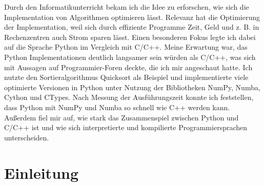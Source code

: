 \documentclass[11pt,a4paper]{article}
\begin{document}
Durch den Informatikunterricht bekam ich die Idee zu erforschen, wie sich
die Implementation von Algorithmen optimieren lässt.
Relevanz hat die Optimierung der Implementation, weil sich durch effiziente Programme Zeit, Geld
und z. B. in Rechenzentren auch Strom sparen lässt.
Einen besonderen Fokus legte ich dabei auf die Sprache Python im Vergleich mit C/C++.
Meine Erwartung war, das Python Implementationen deutlich langsamer sein würden als C/C++,
was sich mit Aussagen auf Programmier-Foren deckte, die ich mir angeschaut hatte.
Ich nutzte den Sortieralgorithmus Quicksort als Beispiel und implementierte viele optimierte Versionen
in Python unter Nutzung der Bibliotheken NumPy, Numba, Cython und CTypes.
Nach Messung der Ausführungszeit konnte ich feststellen, dass Python mit NumPy und Numba
so schnell wie C++ werden kann.
Außerdem fiel mir auf, wie stark das Zusammenspiel zwischen Python und C/C++ ist
und wie sich interpretierte und kompilierte Programmiersprachen unterscheiden.

\clearpage

\renewcommand*\contentsname{Inhaltsverzeichnis}

\tableofcontents

\clearpage

\section{Einleitung}
\end{document}
